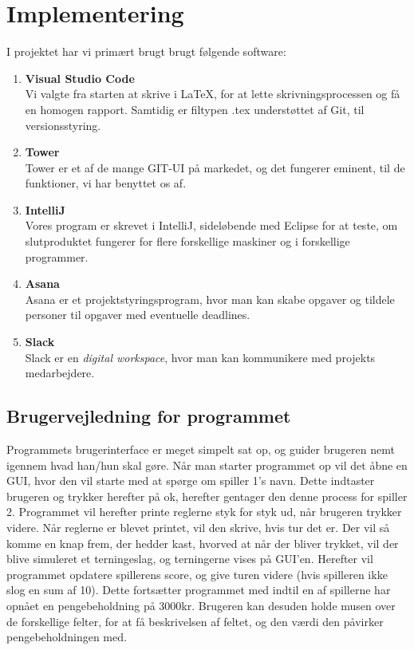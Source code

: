 \chapter{Implementering}
I projektet har vi primært brugt brugt følgende software:
\begin{enumerate}
    \item \textbf{Visual Studio Code}
    \\ Vi valgte fra starten at skrive i LaTeX, for at lette skrivningsprocessen og få en homogen rapport.
    Samtidig er filtypen .tex understøttet af Git, til versionsstyring.
    \item \textbf{Tower}
    \\Tower er et af de mange GIT-UI på markedet, og det fungerer eminent, til de funktioner, vi har benyttet os af.
    \item \textbf{IntelliJ}
    \\Vores program er skrevet i IntelliJ, sideløbende med Eclipse for at teste, om slutproduktet fungerer for flere forskellige maskiner og i forskellige programmer.
    \item \textbf{Asana}
    \\Asana er et projektstyringsprogram, hvor man kan skabe opgaver og tildele personer til opgaver med eventuelle deadlines.
    \item \textbf{Slack}
    \\Slack er en \textit{digital workspace}, hvor man kan kommunikere med projekts medarbejdere.
\end{enumerate}
\section{Brugervejledning for programmet}
Programmets brugerinterface er meget simpelt sat op, og guider brugeren nemt igennem hvad han/hun skal gøre. 
Når man starter programmet op vil det åbne en GUI, hvor den vil starte med at spørge om spiller 1's navn. 
Dette indtaster brugeren og trykker herefter på ok, herefter gentager den denne process for spiller 2. 
Programmet vil herefter printe reglerne styk for styk ud, når brugeren trykker videre. 
Når reglerne er blevet printet, vil den skrive, hvis tur det er. 
Der vil så komme en knap frem, der hedder kast, hvorved at når der bliver trykket, vil der blive simuleret et terningeslag, og terningerne vises på GUI'en. 
Herefter vil programmet opdatere spillerens score, og give turen videre (hvis spilleren ikke slog en sum af 10). 
Dette fortsætter programmet med indtil en af spillerne har opnået en pengebeholdning på 3000kr. 
Brugeren kan desuden holde musen over de forskellige felter, for at få beskrivelsen af feltet, og den værdi den påvirker pengebeholdningen med.
